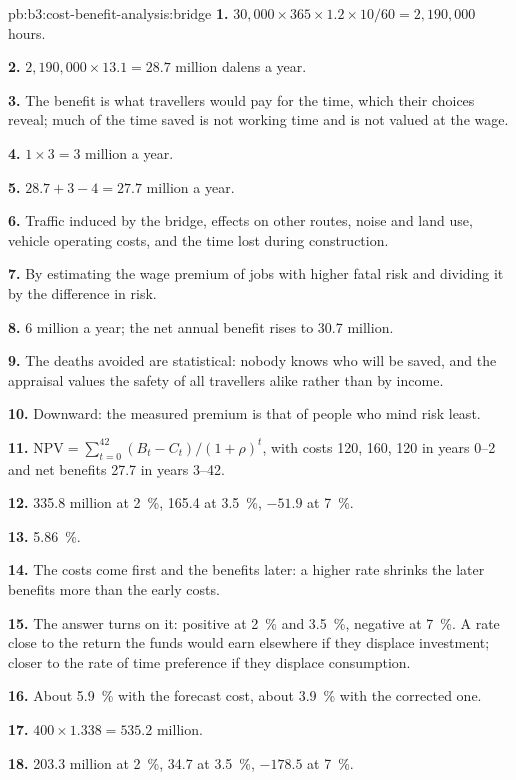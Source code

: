 \begin{solution}{pb:b3:cost-benefit-analysis:bridge}
\textbf{1.} $30{,}000 \times 365 \times 1.2 \times 10/60 = 2{,}190{,}000$ hours.

\textbf{2.} $2{,}190{,}000 \times 13.1 = 28.7$ million dalens a year.

\textbf{3.} The benefit is what travellers would pay for the time, which their choices
reveal; much of the time saved is not working time and is not valued at the wage.

\textbf{4.} $1 \times 3 = 3$ million a year.

\textbf{5.} $28.7 + 3 - 4 = 27.7$ million a year.

\textbf{6.} Traffic induced by the bridge, effects on other routes, noise and land use,
vehicle operating costs, and the time lost during construction.

\textbf{7.} By estimating the wage premium of jobs with higher fatal risk and dividing
it by the difference in risk.

\textbf{8.} 6 million a year; the net annual benefit rises to 30.7 million.

\textbf{9.} The deaths avoided are statistical: nobody knows who will be saved, and the
appraisal values the safety of all travellers alike rather than by income.

\textbf{10.} Downward: the measured premium is that of people who mind risk least.

\textbf{11.} $\mathrm{NPV} = \sum_{t=0}^{42}(B_t - C_t)/(1 + \rho)^t$, with costs 120, 160, 120 in years 0--2 and net benefits 27.7 in years 3--42.

\textbf{12.} 335.8 million at 2~\%, 165.4 at 3.5~\%, $-51.9$ at 7~\%.

\textbf{13.} 5.86~\%.

\textbf{14.} The costs come first and the benefits later: a higher rate shrinks the later
benefits more than the early costs.

\textbf{15.} The answer turns on it: positive at 2~\% and 3.5~\%, negative at 7~\%. A rate close to the
return the funds would earn elsewhere if they displace investment; closer to the
rate of time preference if they displace consumption.

\textbf{16.} About 5.9~\% with the forecast cost, about 3.9~\% with the corrected one.

\textbf{17.} $400 \times 1.338 = 535.2$ million.

\textbf{18.} 203.3 million at 2~\%, 34.7 at 3.5~\%, $-178.5$ at 7~\%.


\end{solution}
